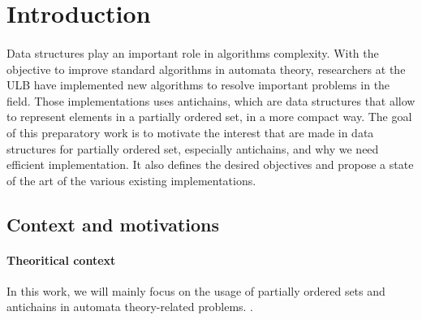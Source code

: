 \documentclass[letterpaper]{article}
\theoremstyle{definition}
\begin{document}
%



\newpage

\tableofcontents

\newpage

\listoftodos

\newpage

\section{Introduction}


\paragraph{}

Data structures play an important role in algorithms complexity.
With the objective to improve standard algorithms in automata theory,
researchers at the ULB
have implemented new algorithms to resolve
important problems in the field. Those implementations uses antichains,
which are data structures that allow to represent elements in a partially
ordered set, in a more compact way.
The goal of this preparatory work is to motivate the interest that
are made in data structures for partially ordered set, especially antichains,
and why we need efficient
implementation.
It also defines the desired objectives
and propose a state of the art of the various existing implementations.

\subsection{Context and motivations}

\paragraph{Theoritical context} In this work, we will mainly focus
on the usage of partially ordered sets and antichains in
automata theory-related problems.
.
\end{document}
